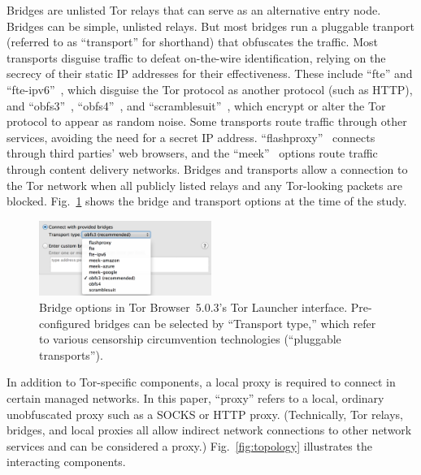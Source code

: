 \documentclass[USenglish,oneside,twocolumn]{article}
\begin{document}
Bridges are unlisted Tor relays that can serve as an alternative entry node.
Bridges can be simple, unlisted relays. 
But most bridges run a pluggable tranport (referred to as ``transport'' for shorthand) that obfuscates the traffic. 
Most transports disguise traffic to defeat on-the-wire identification, relying on the secrecy of their static IP addresses for their effectiveness.
These include ``fte'' and ``fte-ipv6''~\cite{fte},
which disguise the Tor protocol as another protocol (such as HTTP), and
``obfs3''~\cite{obfs3}, ``obfs4''~\cite{obfs4}, and ``scramblesuit''~\cite{scramblesuit},
which encrypt or alter the Tor protocol to appear as random noise.
Some transports route traffic through other services, avoiding the need for a secret IP address. 
``flashproxy''~\cite{flashproxy} connects through third parties' web browsers,
and the ``meek''~\cite{fifield2015blocking} options route traffic
through content delivery networks.
Bridges and transports allow a connection to the Tor network when all publicly listed relays and any Tor-looking packets are blocked. Fig.~\ref{fig:bridge-options} shows the bridge and transport options at the time of the study.

\begin{figure}
  \centering
    \includegraphics[width=0.5\textwidth]{bridge-options.png}
\caption{
Bridge options in Tor Browser~5.0.3's Tor Launcher interface.
Pre-configured bridges can be selected by ``Transport type,'' which refer to various
censorship circumvention technologies (``pluggable transports'').
}
\label{fig:bridge-options}
\end{figure}

In addition to Tor-specific components, a local proxy is required to connect 
in certain managed networks. In this paper, ``proxy'' refers to a local, ordinary unobfuscated proxy such as a SOCKS or HTTP proxy. (Technically, Tor relays, bridges, and local proxies all allow indirect network connections to other network services and can be considered a proxy.) Fig.~\ref{fig:topology} illustrates the interacting components.
\end{document}
